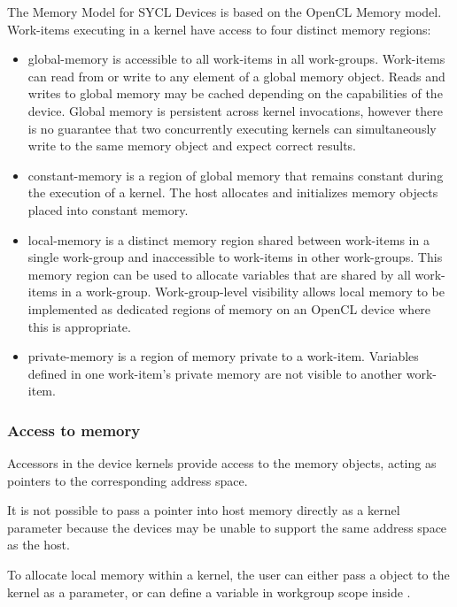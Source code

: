 The Memory Model for SYCL Devices is based on the OpenCL Memory model.
Work-items executing in a kernel have access to four distinct memory regions:

\begin{itemize}
    \item \Gls{global-memory} is accessible to all work-items in all
work-groups. Work-items can read from or write to any element of a global memory
object. Reads and writes to global memory may be cached depending on the
capabilities of the device. Global memory is persistent across kernel
invocations, however there is no guarantee that two concurrently executing
kernels can simultaneously write to the same memory object and expect correct
results.

    \item \Gls{constant-memory} is a region of global memory that remains
constant during the execution of a kernel. The host allocates and initializes
memory objects placed into constant memory.

    \item \Gls{local-memory} is a distinct memory region shared between
work-items in a single work-group and inaccessible to work-items in other
work-groups. This memory region can be used to allocate variables that are
shared by all work-items in a work-group. Work-group-level visibility allows
local memory to be implemented as dedicated regions of memory on an OpenCL
device where this is appropriate.

    \item \Gls{private-memory} is a region of memory private to a work-item.
Variables defined in one work-item's private memory are not visible to another
work-item.
\end{itemize}

\subsubsection{Access to memory}

Accessors in the device kernels provide access to the memory objects, 
acting as pointers to the corresponding address space.

It is not possible to pass a pointer into host memory directly as a kernel
parameter because the devices may be unable to support the same address space
as the host.

To allocate local memory within a kernel, the user can either pass
a  object to the kernel as a parameter, or
can define a variable in workgroup scope inside
.

